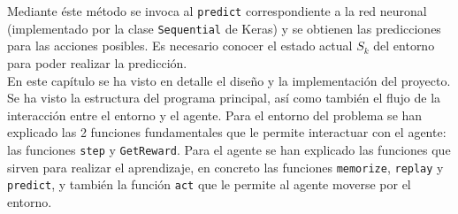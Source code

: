 Mediante éste método se invoca al \texttt{predict} correspondiente a la red neuronal (implementado por la clase \texttt{Sequential} de Keras) y se obtienen las predicciones para las acciones posibles. Es necesario conocer el estado actual $S_k$ del entorno para poder realizar la predicción. \\



En este capítulo se ha visto en detalle el diseño y la implementación del proyecto. Se ha visto la estructura del programa principal, así como también el flujo de la interacción entre el entorno y el agente. Para el entorno del problema se han explicado las 2 funciones fundamentales que le permite interactuar con el agente: las funciones \texttt{step} y \texttt{GetReward}. Para el agente se han explicado las funciones que sirven para realizar el aprendizaje, en concreto las funciones \texttt{memorize}, \texttt{replay} y \texttt{predict}, y también la función \texttt{act} que le permite al agente moverse por el entorno. \\

